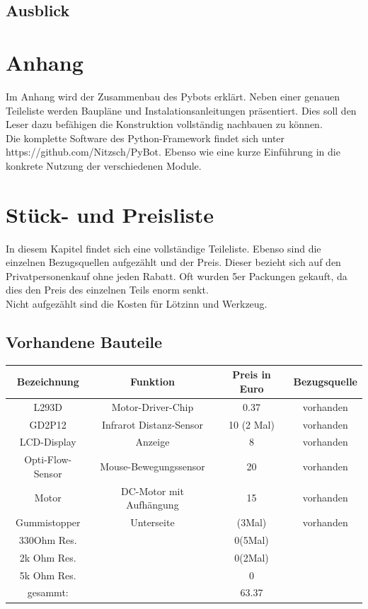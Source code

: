 \documentclass[twoside,12pt,a4paper]{report}
\begin{document}
	
	\section{Ausblick}
	
	
	
	
	\appendix
	\chapter{Anhang}
	Im Anhang wird der Zusammenbau des Pybots erklärt. Neben einer genauen Teileliste werden Baupläne und Instalationsanleitungen präsentiert. Dies soll den Leser dazu befähigen die Konstruktion vollständig nachbauen zu können. \\
	Die komplette Software des Python-Framework findet sich unter https://github.com/Nitzsch/PyBot. Ebenso wie eine kurze Einführung in die konkrete Nutzung der verschiedenen Module. 
	
	\chapter{Stück- und Preisliste}
	In diesem Kapitel findet sich eine vollständige Teileliste. Ebenso sind die einzelnen Bezugsquellen aufgezählt und der Preis. Dieser bezieht sich auf den Privatpersonenkauf ohne jeden Rabatt. Oft wurden 5er Packungen gekauft, da dies den Preis des einzelnen Teils enorm senkt. \\
	Nicht aufgezählt sind die Kosten für Lötzinn und Werkzeug. 
	
	\section{Vorhandene Bauteile}
	\begin{center}
		\begin{tabular}{|c|c|c|c|}
			\hline
			Bezeichnung			&Funktion				& Preis	in Euro	&Bezugsquelle\\
			\hline
			L293D				&Motor-Driver-Chip		& 0.37			& vorhanden		\\
			GD2P12				&Infrarot Distanz-Sensor& 10 (2 Mal)	& vorhanden\\
			LCD-Display			&Anzeige				& 8				& vorhanden	\\
			Opti-Flow-Sensor	&Mouse-Bewegungssensor	& 20			& vorhanden\\
			Motor				& DC-Motor mit Aufhängung& 15			& vorhanden\\
			Gummistopper		& Unterseite			& (3Mal)		& vorhanden \\
			330Ohm Res.			&						& 0(5Mal)		& \\
			2k Ohm Res.			&						& 0(2Mal)		& \\
			5k Ohm Res.			&						& 0				& \\
			\hline
			gesammt:			&						&63.37&\\
			\hline
		\end{tabular}
	\end{center}
	
\end{document}
